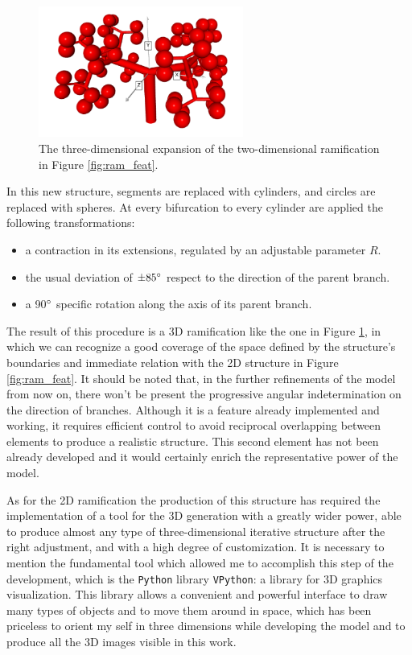     \begin{figure}
        \centering
        \includegraphics[width = 0.6\textwidth]{images/3d_ram}
        \caption{The three-dimensional expansion of the two-dimensional ramification in Figure \ref{fig:ram_feat}.}
        \label{fig:3d_ram}
    \end{figure}

    In this new structure, segments are replaced with cylinders, and circles are replaced with spheres. At every bifurcation to every cylinder are applied the following transformations:
    \begin{itemize}
        \item a contraction in its extensions, regulated by an adjustable parameter $R$.
        \item the usual deviation of $\pm 85 \degree$ respect to the direction of the parent branch.
        \item a 90$\degree$ specific rotation along the axis of its parent branch.
    \end{itemize}

    The result of this procedure is a 3D ramification like the one in Figure \ref{fig:3d_ram}, in which we can recognize a good coverage of the space defined by the structure's boundaries and immediate relation with the 2D structure in Figure \ref{fig:ram_feat}. It should be noted that, in the further refinements of the model from now on, there won't be present the progressive angular indetermination on the direction of branches. Although it is a feature already implemented and working, it requires efficient control to avoid reciprocal overlapping between elements to produce a realistic structure. This second element has not been already developed and it would certainly enrich the representative power of the model.

    As for the 2D ramification the production of this structure has required the implementation of a tool for the 3D generation with a greatly wider power, able to produce almost any type of three-dimensional iterative structure after the right adjustment, and with a high degree of customization. It is necessary to mention the fundamental tool which allowed me to accomplish this step of the development, which is the \texttt{Python} library \texttt{VPython}: a library for 3D graphics visualization. This library allows a convenient and powerful interface to draw many types of objects and to move them around in space, which has been priceless to orient my self in three dimensions while developing the model and to produce all the 3D images visible in this work.

